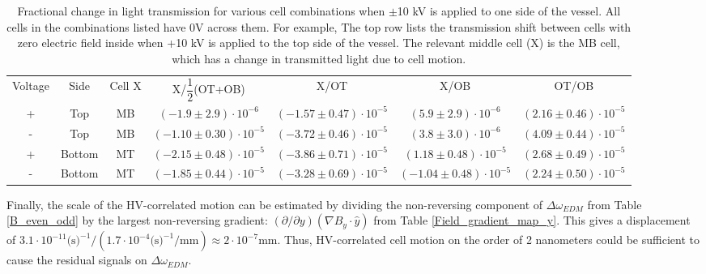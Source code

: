 \documentclass [10pt, twoside] {uwthesis}[2012/04/02]
\begin{document}
\begin{table} [h]													
\begin{center}																					
\caption[Fractional transmission change with voltage for cells with $\mathbf {E}=0$] 
{\narrower Fractional change in light transmission for various cell combinations when $\pm$10 kV is applied to one side of the vessel. All cells in the combinations listed have 0V across them. For example, The top row lists the transmission shift between cells with zero electric field inside when +10 kV is applied to the top side of the vessel. The relevant middle cell (X) is the MB cell, which has a change in transmitted light due to cell motion.}
\begin{tabular}{ccccccc}												
\hline \hline								
Voltage & Side   & Cell X &     X/$\dfrac{1}{2}$(OT+OB)  &              X/OT            &              X/OB            &             OT/OB           \\
   +    & Top    &   MB   & $ (-1.9\pm 2.9)\cdot10^{-6}$ & $(-1.57\pm0.47)\cdot10^{-5}$ & $  (5.9\pm 2.9)\cdot10^{-6}$ & $(2.16\pm0.46)\cdot10^{-5}$ \\
   -    & Top    &   MB   & $(-1.10\pm0.30)\cdot10^{-5}$ & $(-3.72\pm0.46)\cdot10^{-5}$ & $  (3.8\pm 3.0)\cdot10^{-6}$ & $(4.09\pm0.44)\cdot10^{-5}$ \\
   +    & Bottom &   MT   & $(-2.15\pm0.48)\cdot10^{-5}$ & $(-3.86\pm0.71)\cdot10^{-5}$ & $ (1.18\pm0.48)\cdot10^{-5}$ & $(2.68\pm0.49)\cdot10^{-5}$ \\
   -    & Bottom &   MT   & $(-1.85\pm0.44)\cdot10^{-5}$ & $(-3.28\pm0.69)\cdot10^{-5}$ & $(-1.04\pm0.48)\cdot10^{-5}$ & $(2.24\pm0.50)\cdot10^{-5}$ \\ \hline
\end{tabular} 
\label{Stark_shift_1_side} 									
\end{center}
\end{table}

Finally, the scale of the HV-correlated motion can be estimated by dividing the non-reversing component of $\Delta\omega_{EDM}$ from Table \ref{B_even_odd} by the largest non-reversing gradient: $(\partial/\partial y)(\nabla B_y\cdot\hat{y})$ from Table \ref{Field_gradient_map_y}. This gives a displacement of $3.1\cdot10^{-11} \text{(s)}^{-1} /( 1.7 \cdot 10^{-4} \text{(s)}^{-1}\text{/mm}) \approx 2\cdot10^{-7} \text{mm}$. Thus, HV-correlated cell motion on the order of 2 nanometers could be sufficient to cause the residual signals on $\Delta\omega_{EDM}.$
\end{document}
